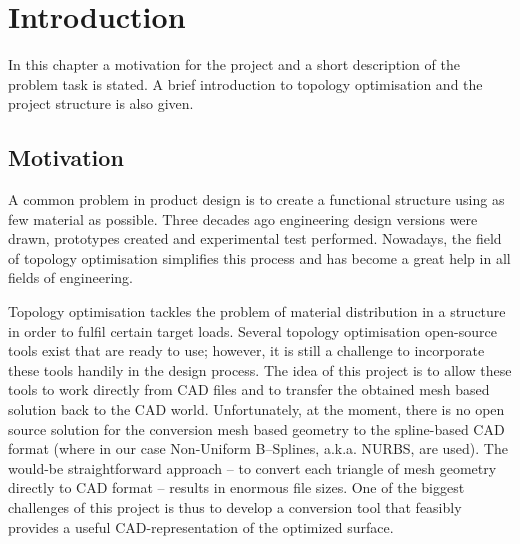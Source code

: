 \chapter{Introduction}
\label{chapter:Introduction}

In this chapter a motivation for the project and a short description of the problem task is stated. A brief introduction to topology optimisation and the project structure is also given.
\section{Motivation}
A common problem in product design is to create a functional structure using as few material as possible. Three decades ago engineering design versions were drawn, prototypes created and experimental test performed. Nowadays, the field of topology optimisation simplifies this process and has become a great help in all fields of engineering. 

Topology optimisation tackles the problem of material distribution in a structure in order to fulfil certain target loads. Several topology optimisation open-source tools exist that are ready to use; however, it is still a challenge to incorporate these tools handily in the design process. The idea of this project is to allow these tools to work directly from CAD files and to transfer the obtained mesh based solution back to the CAD world. Unfortunately, at the moment, there is no open source solution for the conversion mesh based geometry to the spline-based CAD format (where in our case Non-Uniform B--Splines, a.k.a. NURBS, are used). The would-be straightforward approach -- to convert each triangle of mesh geometry directly to CAD format -- results in enormous file sizes. One of the biggest challenges of this project is thus to develop a conversion tool that feasibly provides a useful CAD-representation of the optimized surface.


%
%

